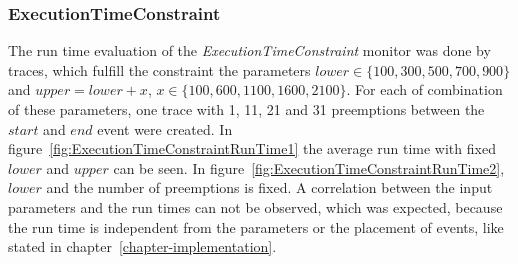 \subsubsection{ExecutionTimeConstraint}
	The run time evaluation of the \textit{ExecutionTimeConstraint} monitor was done by traces, which fulfill the constraint the parameters $lower\in\{100,300,500,700,900\}$ and $upper=lower+x$, $x\in\{100,600,1100,1600,2100\}$. For each of combination of these parameters, one trace with 1, 11, 21 and 31 preemptions between the $start$ and $end$ event were created. In figure~\ref{fig:ExecutionTimeConstraintRunTime1} the average run time with fixed $lower$ and $upper$ can be seen. In figure~\ref{fig:ExecutionTimeConstraintRunTime2}, $lower$ and the number of preemptions is fixed. A correlation between the input parameters and the run times can not be observed, which was expected, because the run time is independent from the parameters or the placement of events, like stated in chapter~\ref{chapter-implementation}.
